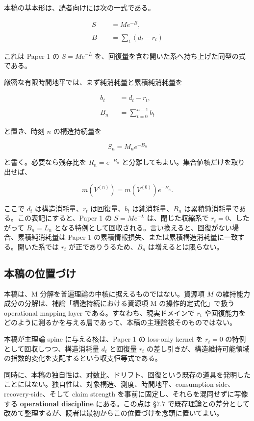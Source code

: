 \documentclass[12pt,a4paper]{article}
\begin{document}
本稿の基本形は、読者向けには次の一式である。

\[
\begin{aligned}
S &= M e^{-B}, \\
\qquad \\
B &= \sum_{t}(d_{t}-r_{t})
\end{aligned}
\]

これは Paper 1 の \(S=Me^{-L}\) を、回復量を含む開いた系へ持ち上げた同型の式である。

厳密な有限時間地平では、まず純消耗量と累積純消耗量を

\[
\begin{aligned}
b_{t} &= d_{t} - r_{t}, \\
\qquad \\
B_{n} &= \sum_{t=0}^{n-1} b_{t}
\end{aligned}
\]

と置き、時刻 \(n\) の構造持続量を

\[
S_{n} = M_{n} e^{-B_{n}}
\]

と書く。必要なら残存比を \(R_{n}=e^{-B_{n}}\) と分離してもよい。集合値核だけを取り出せば、

\[
m(V^{(n)}) = m(V^{(0)}) e^{-B_{n}}.
\]

ここで \(d_{t}\) は構造消耗量、\(r_{t}\) は回復量、\(b_{t}\) は純消耗量、\(B_{n}\) は累積純消耗量である。この表記にすると、Paper 1 の \(S=Me^{-L}\) は、閉じた収縮系で \(r_{t}=0\)、したがって \(B_{n}=L_{n}\) となる特例として回収される。言い換えると、回復がない場合、累積純消耗量は Paper 1 の累積情報損失、または累積構造消耗量に一致する。開いた系では \(r_{t}\) が正でありうるため、\(B_{n}\) は増えるとは限らない。

\subsection{本稿の位置づけ}\label{ux672cux7a3fux306eux4f4dux7f6eux3065ux3051}

本稿は、M 分解を普遍理論の中核に据えるものではない。資源項 \(M\) の維持能力成分の分解は、補論「構造持続における資源項 M の操作的定式化」で扱う operational mapping layer である。すなわち、現実ドメインで \(r_{t}\) や回復能力をどのように測るかを与える層であって、本稿の主理論核そのものではない。

本稿が主理論 spine に与える核は、Paper 1 の loss-only kernel を \(r_{t}=0\) の特例として回収しつつ、構造消耗量 \(d_{t}\) と回復量 \(r_{t}\) の差し引きが、構造維持可能領域の指数的変化を支配するという収支恒等式である。

同時に、本稿の独自性は、対数比、ドリフト、回復という既存の道具を発明したことにはない。独自性は、対象構造、測度、時間地平、consumption-side、recovery-side、そして claim strength を事前に固定し、それらを混同せずに写像する \textbf{operational discipline} にある。この点は §7.7 で既存理論との差分として改めて整理するが、読者は最初からこの位置づけを念頭に置いてよい。
\end{document}

